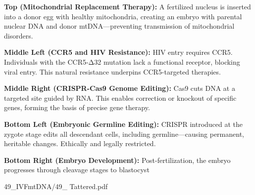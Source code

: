 \begin{SideNotePage}{
  \textbf{Top (Mitochondrial Replacement Therapy):}  
  A fertilized nucleus is inserted into a donor egg with healthy mitochondria, creating an embryo with parental nuclear DNA and donor mtDNA—preventing transmission of mitochondrial disorders.

  \textbf{Middle Left (CCR5 and HIV Resistance):}  
  HIV entry requires CCR5. Individuals with the CCR5-Δ32 mutation lack a functional receptor, blocking viral entry. This natural resistance underpins CCR5-targeted therapies.

  \textbf{Middle Right (CRISPR-Cas9 Genome Editing):}  
  Cas9 cuts DNA at a targeted site guided by RNA. This enables correction or knockout of specific genes, forming the basis of precise gene therapy.

  \textbf{Bottom Left (Embryonic Germline Editing):}  
  CRISPR introduced at the zygote stage edits all descendant cells, including germline—causing permanent, heritable changes. Ethically and legally restricted.

  \textbf{Bottom Right (Embryo Development):}  
  Post-fertilization, the embryo progresses through cleavage stages to blastocyst
}{49_IVFmtDNA/49_ Tattered.pdf}
\end{SideNotePage}

